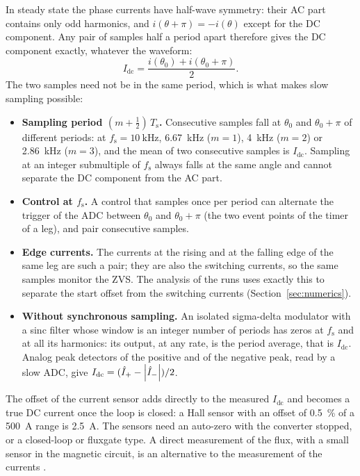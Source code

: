 \documentclass[12pt,a4paper]{scrartcl}
\newcommand{\ped}[1]{_{\mathrm{#1}}}
\begin{document}
\begin{onehalfspace}
In steady state the phase currents have half-wave symmetry: their AC part contains only odd harmonics, and $i(\theta + \pi) = -i(\theta)$ except for the DC component. Any pair of samples half a period apart therefore gives the DC component exactly, whatever the waveform:
\begin{equation}
	I\ped{dc} = \frac{i(\theta\ped{0}) + i(\theta\ped{0} + \pi)}{2}.
	\label{eq:dcpair}
\end{equation}
The two samples need not be in the same period, which is what makes slow sampling possible:
\begin{itemize}[nosep]
	\item \textbf{Sampling period $(m + \frac{1}{2})\,T\ped{s}$.} Consecutive samples fall at $\theta\ped{0}$ and $\theta\ped{0} + \pi$ of different periods: at $f\ped{s} = \SI{10}{\kilo\hertz}$, \SI{6.67}{\kilo\hertz} ($m = 1$), \SI{4}{\kilo\hertz} ($m = 2$) or \SI{2.86}{\kilo\hertz} ($m = 3$), and the mean of two consecutive samples is $I\ped{dc}$. Sampling at an integer submultiple of $f\ped{s}$ always falls at the same angle and cannot separate the DC component from the AC part.
	\item \textbf{Control at $f\ped{s}$.} A control that samples once per period can alternate the trigger of the ADC between $\theta\ped{0}$ and $\theta\ped{0} + \pi$ (the two event points of the timer of a leg), and pair consecutive samples.
	\item \textbf{Edge currents.} The currents at the rising and at the falling edge of the same leg are such a pair; they are also the switching currents, so the same samples monitor the ZVS. The analysis of the runs uses exactly this to separate the start offset from the switching currents (Section~\ref{sec:numerics}).
	\item \textbf{Without synchronous sampling.} An isolated sigma-delta modulator with a sinc filter whose window is an integer number of periods has zeros at $f\ped{s}$ and at all its harmonics: its output, at any rate, is the period average, that is $I\ped{dc}$. Analog peak detectors of the positive and of the negative peak, read by a slow ADC, give $I\ped{dc} = (\hat{I}\ped{+} - \abs{\hat{I}\ped{-}})/2$.
\end{itemize}
The offset of the current sensor adds directly to the measured $I\ped{dc}$ and becomes a true DC current once the loop is closed: a Hall sensor with an offset of \SI{0.5}{\percent} of a \SI{500}{\ampere} range is \SI{2.5}{\ampere}. The sensors need an auto-zero with the converter stopped, or a closed-loop or fluxgate type. A direct measurement of the flux, with a small sensor in the magnetic circuit, is an alternative to the measurement of the currents \cite{ortiz2014}.


\end{onehalfspace}
\end{document}
